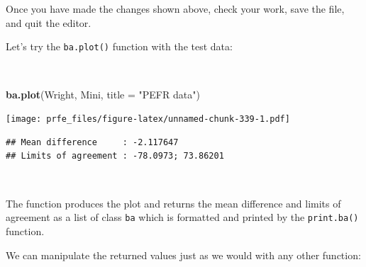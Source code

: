 \documentclass[12pt,a4paper]{book}
\newenvironment{Shaded}{\begin{snugshade}}{\end{snugshade}}
\newcommand{\CharTok}[1]{\textcolor[rgb]{0.31,0.60,0.02}{#1}}
\newcommand{\ControlFlowTok}[1]{\textcolor[rgb]{0.13,0.29,0.53}{\textbf{#1}}}
\newcommand{\DataTypeTok}[1]{\textcolor[rgb]{0.13,0.29,0.53}{#1}}
\newcommand{\DecValTok}[1]{\textcolor[rgb]{0.00,0.00,0.81}{#1}}
\newcommand{\KeywordTok}[1]{\textcolor[rgb]{0.13,0.29,0.53}{\textbf{#1}}}
\newcommand{\NormalTok}[1]{#1}
\newcommand{\OperatorTok}[1]{\textcolor[rgb]{0.81,0.36,0.00}{\textbf{#1}}}
\newcommand{\StringTok}[1]{\textcolor[rgb]{0.31,0.60,0.02}{#1}}
\theoremstyle{definition}
\theoremstyle{definition}
\theoremstyle{definition}
\theoremstyle{remark}
\begin{document}
~

\begin{Shaded}
\end{Shaded}

~

Once you have made the changes shown above, check your work, save the
file, and quit the editor.

Let's try the \texttt{ba.plot()} function with the test data:

~

\begin{Shaded}
\begin{Highlighting}[]
\KeywordTok{ba.plot}\NormalTok{(Wright, Mini, }\DataTypeTok{title =} \StringTok{"PEFR data"}\NormalTok{)}
\end{Highlighting}
\end{Shaded}

\texttt{[image: prfe\_files/figure-latex/unnamed-chunk-339-1.pdf]}

\begin{verbatim}
## Mean difference     : -2.117647
## Limits of agreement : -78.0973; 73.86201
\end{verbatim}

~

The function produces the plot and returns the mean difference and
limits of agreement as a list of class \texttt{ba} which is formatted
and printed by the \texttt{print.ba()} function.

We can manipulate the returned values just as we would with any other
function:

~

\begin{Shaded}
\end{Shaded}
\end{document}

